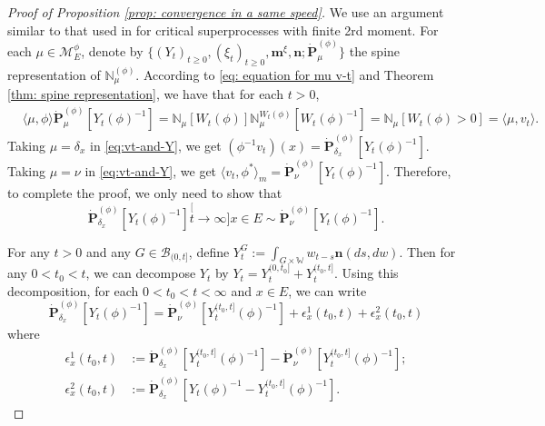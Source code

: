 \documentclass[12pt, a4paper]{amsart}
\theoremstyle{definition}
\numberwithin{equation}{section}
\begin{document}
\begin{proof}[Proof of Proposition \ref{prop: convergence in a same speed}]
	We use an argument similar to that used in \cite{RenSongSun2017Spine} for critical superprocesses with finite 2rd moment.
	For each $\mu\in\mathcal M^\phi_E$, denote by $\{(Y_t)_{t\geq 0}, (\xi_t)_{t\geq 0},\mathbf m^\xi, \mathbf n; \dot {\mathbf P}^{(\phi)}_\mu\}$ the spine representation of $\mathbb N^{(\phi)}_\mu$.
	According to \eqref	{eq: equation for mu v-t} and Theorem \ref{thm: spine representation}, 
	we have that for each $t>0$,
\[\begin{split}\label{eq:vt-and-Y}
	&\langle \mu,\phi \rangle \dot {\mathbf P}^{(\phi)}_\mu [Y_t(\phi)^{-1}]
	= \mathbb N_\mu[W_t(\phi)] \mathbb N^{W_t(\phi)}_\mu [W_t(\phi)^{-1}]
	= \mathbb N_\mu[W_t(\phi) > 0]
	= \langle \mu,v_t \rangle.
\end{split}\]
	Taking $\mu = \delta_x$ in \eqref{eq:vt-and-Y}, we get $(\phi^{-1}v_t)(x) =\dot{\mathbf P}_{\delta_x}^{(\phi)}[Y_t(\phi)^{-1}]$.
	Taking $\mu = \nu$ in \eqref{eq:vt-and-Y}, we get $\langle v_t, \phi^*\rangle_m = \dot {\mathbf P}_{\nu}^{(\phi)} [Y_t(\phi)^{-1}]$.
	Therefore, to complete the proof, 
	we only need to show that
\[
	\dot{\mathbf P}_{\delta_x}^{(\phi)}[Y_t(\phi)^{-1}]
	\stackrel[t\to \infty]{x\in E}{\sim}  \dot {\mathbf P}_\nu^{(\phi)} [Y_t(\phi)^{-1}].
\]

	For any $t>0$ and any $G\in \mathscr B_{(0,t]}$, define
$
	Y^G_t
	:= \int_{G\times \mathbb W} w_{t-s} \mathbf n(ds,dw).
$
	Then for any $0 < t_0 < t$, we can decompose $Y_t$ by
$
	Y_t
	= Y^{(0,t_0]}_t + Y^{(t_0,t]}_t.
$
	Using this decomposition, for each $0<t_0<t<\infty$ and $x\in E$, we can write
\[\label{eq: starting point of phi-1v_t(x)}
	 \dot{\mathbf P}_{\delta_x}^{(\phi)}[Y_t(\phi)^{-1}]
	= \dot {\mathbf P}_\nu^{(\phi)} [Y^{(t_0,t]}_t(\phi)^{-1}] + \epsilon_x^1(t_0,t) +\epsilon_x^2(t_0,t)
\]
	where
\[\begin{split}
	\epsilon_x^1(t_0,t)
	&:= \dot {\mathbf P}_{\delta_x}^{(\phi)} [Y^{(t_0,t]}_t(\phi)^{-1}] - \dot {\mathbf P}_\nu^{(\phi)} [Y^{(t_0,t]}_t(\phi)^{-1}];
	\\\epsilon_x^2(t_0,t)
	&:= \dot{\mathbf P}_{\delta_x}^{(\phi)}[Y_t(\phi)^{-1} - Y^{(t_0,t]}_t(\phi)^{-1}].
\end{split}\]


\end{proof}
\end{document}
